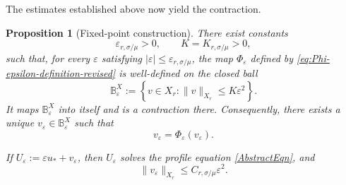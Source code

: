 \documentclass[12pt]{amsart}
\newtheorem{proposition}[theorem]{Proposition}
\theoremstyle{remark}
\theoremstyle{definition}
\numberwithin{equation}{section}
\begin{document}
The estimates established above now yield the contraction.

\begin{proposition}[Fixed-point construction]
\label{prop:fixed-point-construction-revised}
There exist constants
\[
 \varepsilon_{r,\sigma/\mu}>0, \qquad K=K_{r,\sigma/\mu}>0,
\]
such that, for every \(\varepsilon\) satisfying
\(|\varepsilon|\leq\varepsilon_{r,\sigma/\mu}\),
the map \(\Phi_\varepsilon\) defined by \eqref{eq:Phi-epsilon-definition-revised} is well-defined on the closed ball
\[
 \mathbb B_\varepsilon^X := \left\{ v\in X_r: \|v\|_{X_r}\leq K\varepsilon^2 \right\}.
\]
It maps \(\mathbb B_\varepsilon^X\) into itself and is a contraction there.
Consequently, there exists a unique
\(v_\varepsilon\in\mathbb B_\varepsilon^X\) such that
\[
 v_\varepsilon=\Phi_\varepsilon(v_\varepsilon).
\]

If \(U_\varepsilon:=\varepsilon u_*+v_\varepsilon\), then \(U_\varepsilon\) solves the profile equation \eqref{AbstractEqn}, and
\begin{equation}
\label{eq:v-fixed-point-bound}
 \|v_\varepsilon\|_{X_r} \leq C_{r,\sigma/\mu}\varepsilon^2.
\end{equation}
\end{proposition}
\end{document}
